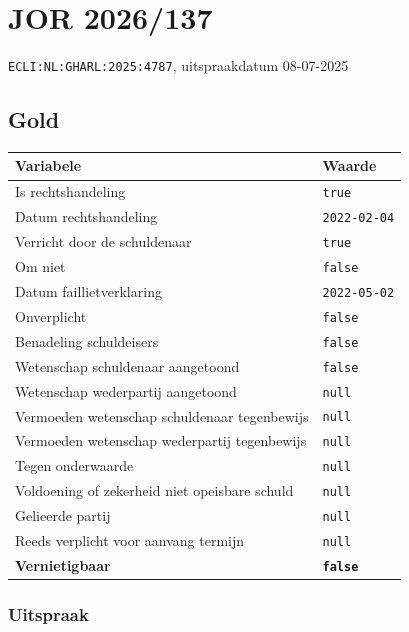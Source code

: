 \documentclass[
  dutch,
  a4paper,
]{article}
\begin{document}
\section{JOR 2026/137}\label{jor-2026137}

\texttt{ECLI:NL:GHARL:2025:4787}, uitspraakdatum 08-07-2025

\subsection{Gold}\label{gold-1}

\begin{center}
\small
\begin{tabular}{@{}p{8cm}p{2.6cm}@{}}
\toprule
Variabele & Waarde \\
\midrule
Is rechtshandeling & \texttt{true} \\
Datum rechtshandeling & \texttt{2022-02-04} \\
Verricht door de schuldenaar & \texttt{true} \\
Om niet & \texttt{false} \\
Datum faillietverklaring & \texttt{2022-05-02} \\
Onverplicht & \texttt{false} \\
Benadeling schuldeisers & \texttt{false} \\
Wetenschap schuldenaar aangetoond & \texttt{false} \\
Wetenschap wederpartij aangetoond & \texttt{null} \\
Vermoeden wetenschap schuldenaar tegenbewijs & \texttt{null} \\
Vermoeden wetenschap wederpartij tegenbewijs & \texttt{null} \\
Tegen onderwaarde & \texttt{null} \\
Voldoening of zekerheid niet opeisbare schuld & \texttt{null} \\
Gelieerde partij & \texttt{null} \\
Reeds verplicht voor aanvang termijn & \texttt{null} \\
\textbf{Vernietigbaar} & \textbf{\texttt{false}} \\
\bottomrule
\end{tabular}
\end{center}

\subsubsection{Uitspraak}\label{uitspraak-1}
\end{document}
